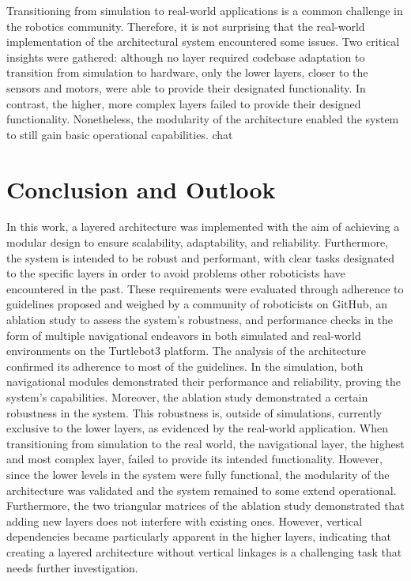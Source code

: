 \documentclass[%
paper=A4,               %
twoside=true,           %
openright,              %
11pt,                   %
bibliography=totoc,     %
titlepage=on,           %
DIV=12,                 %
BCOR=1.5cm,             %
parskip=half,            %
final
]{scrreprt}
\begin{document}
	Transitioning from simulation to real-world applications is a common challenge in the robotics community. Therefore, it is not surprising that the real-world implementation of the architectural system encountered some issues. Two critical insights were gathered: although no layer required codebase adaptation to transition from simulation to hardware, only the lower layers, closer to the sensors and motors, were able to provide their designated functionality. In contrast, the higher, more complex layers failed to provide their designed functionality. Nonetheless, the modularity of the architecture enabled the system to still gain basic operational capabilities.
	chat 

	\chapter{Conclusion and Outlook}
	In this work, a layered architecture was implemented with the aim of achieving a modular design to ensure scalability, adaptability, and reliability. Furthermore, the system is intended to be robust and performant, with clear tasks designated to the specific layers in order to avoid problems other roboticists have encountered in the past.
	 \newline
	\newline These requirements were evaluated through adherence to guidelines proposed and weighed by a community of roboticists on GitHub, an ablation study to assess the system's robustness, and performance checks in the form of multiple navigational endeavors in both simulated and real-world environments on the Turtlebot3 platform. The analysis of the architecture confirmed its adherence to most of the guidelines. In the simulation, both navigational modules demonstrated their performance and reliability, proving the system's capabilities. Moreover, the ablation study demonstrated a certain robustness in the system. This robustness is, outside of simulations, currently exclusive to the lower layers, as evidenced by the real-world application. When transitioning from simulation to the real world, the navigational layer, the highest and most complex layer, failed to provide its intended functionality. However, since the lower levels in the system were fully functional, the modularity of the architecture was validated and the system remained to some extend operational. Furthermore, the two triangular matrices of the ablation study demonstrated that adding new layers does not interfere with existing ones. However, vertical dependencies became particularly apparent in the higher layers, indicating that creating a layered architecture without vertical linkages is a challenging task that needs further investigation. 
	
\end{document}
